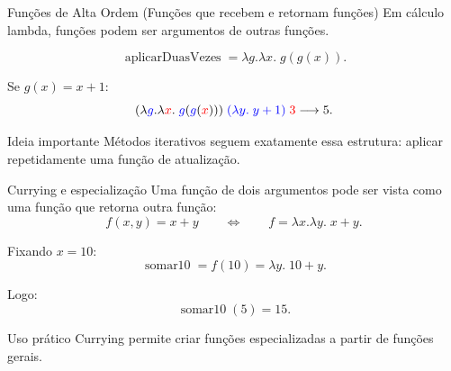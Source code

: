 \documentclass[aspectratio=169,11pt]{beamer}
\begin{document}
\begin{frame}{Funções de Alta Ordem (Funções que recebem e retornam funções)}
  Em cálculo lambda, funções podem ser argumentos de outras funções.

  \begin{equation*}
    \operatorname{aplicarDuasVezes}=\lambda g.\lambda x.\;g(g(x)).
  \end{equation*}

  Se $g(x)=x+1$:
  \begin{equation*}
    (\lambda \textcolor{blue}{g}.\lambda \textcolor{red}{x}.\;\textcolor{blue}{g}(\textcolor{blue}{g}(\textcolor{red}{x})))\;\textcolor{blue}{(\lambda y.\;y+1)}\;\textcolor{red}{3}
    \longrightarrow
    5.
  \end{equation*}

  \begin{block}{Ideia importante}
    Métodos iterativos seguem exatamente essa estrutura: aplicar repetidamente uma função de atualização.
  \end{block}
\end{frame}

\begin{frame}{Currying e especialização}
  Uma função de dois argumentos pode ser vista como uma função que retorna outra função:
  \begin{equation*}
    f(x,y)=x+y
    \qquad\Longleftrightarrow\qquad
    f=\lambda x.\lambda y.\;x+y.
  \end{equation*}

  Fixando $x=10$:
  \begin{equation*}
    \operatorname{somar10}=f(10)=\lambda y.\;10+y.
  \end{equation*}

  Logo:
  \begin{equation*}
    \operatorname{somar10}(5)=15.
  \end{equation*}

  \begin{block}{Uso prático}
    Currying permite criar funções especializadas a partir de funções gerais.
  \end{block}
\end{frame}
\end{document}
